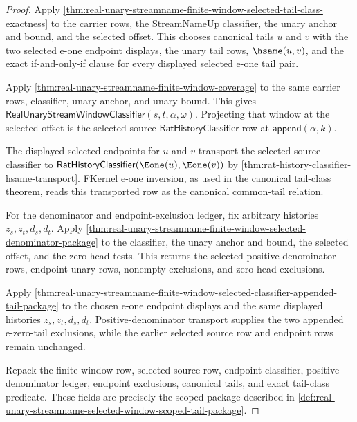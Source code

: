 \begin{proof}
Apply
\autoref{thm:real-unary-streamname-finite-window-selected-tail-class-exactness}
to the carrier rows, the StreamNameUp classifier, the unary anchor and bound,
and the selected offset. This chooses canonical tails $u$ and $v$ with the two
selected e-one endpoint displays, the unary tail rows, $\hsame(u,v)$, and the
exact if-and-only-if clause for every displayed selected e-one tail pair.

Apply \autoref{thm:real-unary-streamname-finite-window-coverage} to the same
carrier rows, classifier, unary anchor, and unary bound. This gives
$\mathsf{RealUnaryStreamWindowClassifier}(s,t,\alpha,\omega)$. Projecting that
window at the selected offset is the selected source
$\mathsf{RatHistoryClassifier}$ row at $\mathsf{append}(\alpha,k)$.

The displayed selected endpoints for $u$ and $v$ transport the selected source
classifier to $\mathsf{RatHistoryClassifier}(\Eone(u),\Eone(v))$ by
\autoref{thm:rat-history-classifier-hsame-transport}. FKernel e-one inversion,
as used in the canonical tail-class theorem, reads this transported row as the
canonical common-tail relation.

For the denominator and endpoint-exclusion ledger, fix arbitrary histories
$z_s,z_t,d_s,d_t$. Apply
\autoref{thm:real-unary-streamname-finite-window-selected-denominator-package}
to the classifier, the unary anchor and bound, the selected offset, and the
zero-head tests. This returns the selected positive-denominator rows, endpoint
unary rows, nonempty exclusions, and zero-head exclusions.

Apply
\autoref{thm:real-unary-streamname-finite-window-selected-classifier-appended-tail-package}
to the chosen e-one endpoint displays and the same displayed histories
$z_s,z_t,d_s,d_t$. Positive-denominator transport supplies the two appended
e-zero-tail exclusions, while the earlier selected source row and endpoint rows
remain unchanged.

Repack the finite-window row, selected source row, endpoint classifier,
positive-denominator ledger, endpoint exclusions, canonical tails, and exact
tail-class predicate. These fields are precisely the scoped package described
in \autoref{def:real-unary-streamname-selected-window-scoped-tail-package}.
\end{proof}
